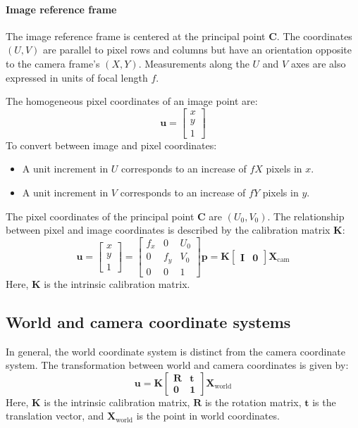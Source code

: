 \paragraph*{Image reference frame}
The image reference frame is centered at the principal point $\mathbf{C}$.
The coordinates $(U, V)$ are parallel to pixel rows and columns but have an orientation opposite to the camera frame's $(X, Y)$.
Measurements along the $U$ and $V$ axes are also expressed in units of focal length $f$.

The homogeneous pixel coordinates of an image point are:
\[\mathbf{u} = \begin{bmatrix} x \\ y \\ 1 \end{bmatrix}\]
To convert between image and pixel coordinates:
\begin{itemize}
    \item A unit increment in $U$ corresponds to an increase of $fX$ pixels in $x$.
    \item A unit increment in $V$ corresponds to an increase of $fY$ pixels in $y$.
\end{itemize}
The pixel coordinates of the principal point $\mathbf{C}$ are $(U_0, V_0)$.
The relationship between pixel and image coordinates is described by the calibration matrix $\mathbf{K}$:
\[\mathbf{u} = \begin{bmatrix} x \\ y \\ 1 \end{bmatrix} = \begin{bmatrix} f_x & 0 & U_0 \\ 0 & f_y & V_0 \\ 0 & 0 & 1 \end{bmatrix} \mathbf{p}=\mathbf{K}\begin{bmatrix} \mathbf{I} & \mathbf{0}\end{bmatrix}\mathbf{X}_\text{cam}\]
Here, $\mathbf{K}$ is the intrinsic calibration matrix.

\subsection{World and camera coordinate systems}
In general, the world coordinate system is distinct from the camera coordinate system.
The transformation between world and camera coordinates is given by:
\[\mathbf{u} = \mathbf{K} \begin{bmatrix} \mathbf{R} & \mathbf{t} \\ \mathbf{0} & \mathbf{1}\end{bmatrix}\mathbf{X}_\text{world}\]
Here, $\mathbf{K}$ is the intrinsic calibration matrix, $\mathbf{R}$ is the rotation matrix, $\mathbf{t}$ is the translation vector, and $\mathbf{X}_\text{world}$ is the point in world coordinates.

